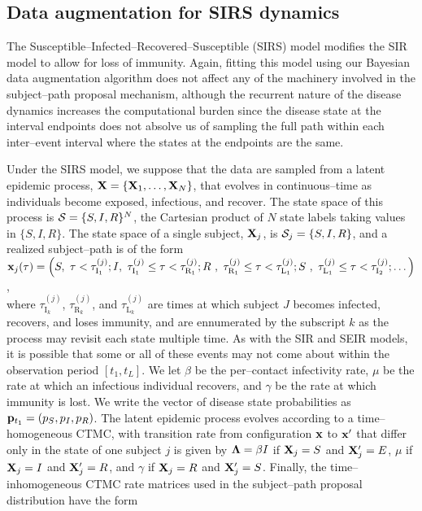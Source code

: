 \subsection{Data augmentation for SIRS dynamics}
\label{subsec:bda_sirs_model}

The Susceptible--Infected--Recovered--Susceptible (SIRS) model modifies the SIR model to allow for loss of immunity. Again, fitting this model using our Bayesian data augmentation algorithm does not affect any of the machinery involved in the subject--path proposal mechanism, although the recurrent nature of the disease dynamics increases the computational burden since the disease state at the interval endpoints does not absolve us of sampling the full path within each inter--event interval where the states at the endpoints are the same.

Under the SIRS model, we suppose that the data are sampled from a latent epidemic process, $ \mathbf{X} = \lbrace \mathbf{X}_1,\dots,\mathbf{X}_N\rbrace $, that evolves in continuous--time as individuals become exposed, infectious, and recover. The state space of this process is $ \mathcal{S} = \lbrace S,I,R\rbrace^N $, the Cartesian product of $ N $ state labels taking values in $ \lbrace S,I,R\rbrace $. The state space of a single subject, $ \mathbf{X}_j $, is $\mathcal{S}_j = \lbrace S, I, R\rbrace $, and a realized subject--path is of the form\\ $ \mathbf{x}_j(\tau) = \left (S,\ \tau < \tau^{(j)}_{\mathrm{I}_1}; 
	I,\ \tau^{(j)}_{\mathrm{I}_1} \leq \tau < \tau^{(j)}_{\mathrm{R}_1};
	R\ ,\ \tau^{(j)}_{\mathrm{R}_1} \leq \tau < \tau^{(j)}_{\mathrm{L}_1}; 
	S\ ,\ \tau^{(j)}_{\mathrm{L}_1} \leq \tau < \tau^{(j)}_{\mathrm{I}_2};\dots
	\right ) $,\\
where $ \tau^{(j)}_{\mathrm{I}_k} $, $ \tau^{(j)}_{\mathrm{R}_k} $, and $ \tau^{(j)}_{\mathrm{L}_k} $ are times at which subject $ J $ becomes infected, recovers, and loses immunity, and are ennumerated by the subscript $ k $ as the process may revisit each state multiple time. As with the SIR and SEIR models, it is possible that some or all of these events may not come about within the observation period $ [t_1,t_L] $. We let $ \beta $ be the per--contact infectivity rate, $ \mu $ be the rate at which an infectious individual recovers, and $ \gamma $ be the rate at which immunity is lost. We write the vector of disease state probabilities as $ \mathbf{p}_{t_1} = (p_S,p_I,p_R) $. The latent epidemic process evolves according to a time--homogeneous CTMC, with transition rate from configuration $ \mathbf{x} $ to $ \mathbf{x}^\prime $ that differ only in the state of one subject $ j $ is given by $ \boldsymbol{\Lambda} = \beta I $ if $ \mathbf{X}_j = S $ and $ \mathbf{X}^\prime_j = E$, $ \mu $ if $ \mathbf{X}_j = I $ and $ \mathbf{X}^\prime_j = R$, and $ \gamma $ if $ \mathbf{X}_j = R $ and $ \mathbf{X}^\prime_j = S$. Finally, the time--inhomogeneous CTMC rate matrices used in the subject--path proposal distribution have the form
